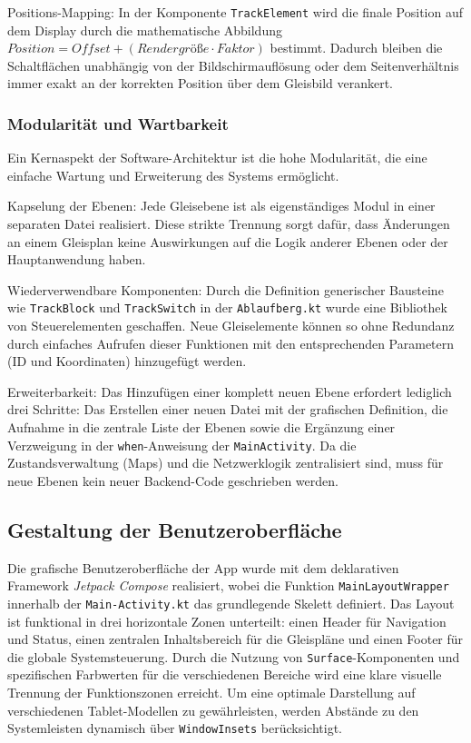 \documentclass{article}
\begin{document}
Positions-Mapping:
In der Komponente \texttt{TrackElement} wird die finale Position auf dem Display durch die mathematische Abbildung $Position = Offset + (Rendergr\text{ö\ss}e \cdot Faktor)$ bestimmt.
Dadurch bleiben die Schaltflächen unabhängig von der Bildschirmauflösung oder dem Seitenverhältnis immer exakt an der korrekten Position über dem Gleisbild verankert.


\subsubsection{Modularität und Wartbarkeit}
Ein Kernaspekt der Software-Architektur ist die hohe Modularität, die eine einfache Wartung und Erweiterung des Systems ermöglicht.

Kapselung der Ebenen:
Jede Gleisebene ist als eigenständiges Modul in einer separaten Datei realisiert.
Diese strikte Trennung sorgt dafür, dass Änderungen an einem Gleisplan keine Auswirkungen auf die Logik anderer Ebenen oder der Hauptanwendung haben.

Wiederverwendbare Komponenten:
Durch die Definition generischer Bausteine wie \texttt{TrackBlock} und \texttt{TrackSwitch} in der \texttt{Ablaufberg.kt} wurde eine Bibliothek von Steuerelementen geschaffen.
Neue Gleiselemente können so ohne Redundanz durch einfaches Aufrufen dieser Funktionen mit den entsprechenden Parametern (ID und Koordinaten) hinzugefügt werden.

Erweiterbarkeit:
Das Hinzufügen einer komplett neuen Ebene erfordert lediglich drei Schritte:
Das Erstellen einer neuen Datei mit der grafischen Definition, die Aufnahme in die zentrale Liste der Ebenen sowie die Ergänzung einer Verzweigung in der \texttt{when}-Anweisung der \texttt{MainActivity}.
Da die Zustandsverwaltung (Maps) und die Netzwerklogik zentralisiert sind, muss für neue Ebenen kein neuer Backend-Code geschrieben werden.



\subsection{Gestaltung der Benutzeroberfläche}
Die grafische Benutzeroberfläche der App wurde mit dem deklarativen Framework \textit{Jetpack Compose} \cite{jetpackcompose} realisiert, wobei die Funktion \texttt{MainLayoutWrapper} innerhalb der \texttt{Main-Activity.kt} das grundlegende Skelett definiert.
Das Layout ist funktional in drei horizontale Zonen unterteilt:
einen Header für Navigation und Status, einen zentralen Inhaltsbereich für die Gleispläne und einen Footer für die globale Systemsteuerung.
Durch die Nutzung von \texttt{Surface}-Komponenten und spezifischen Farbwerten für die verschiedenen Bereiche wird eine klare visuelle Trennung der Funktionszonen erreicht.
Um eine optimale Darstellung auf verschiedenen Tablet-Modellen zu gewährleisten, werden Abstände zu den Systemleisten dynamisch über \texttt{WindowInsets} berücksichtigt.
\end{document}
